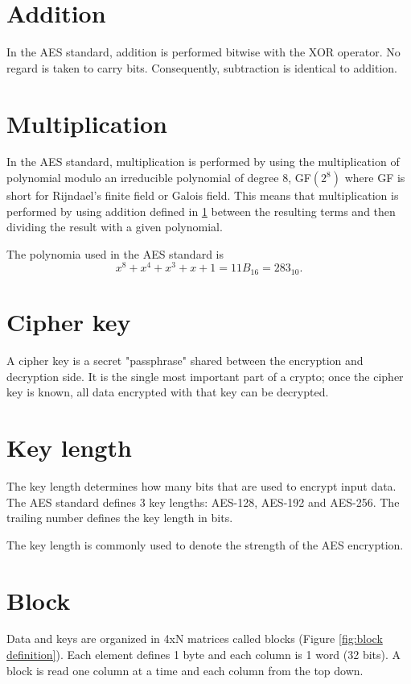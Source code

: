 \documentclass[report.tex]{subfiles}
\begin{document}
\section{Addition}\label{sec:addition}
In the AES standard, addition is performed bitwise with the XOR operator. No regard is taken to carry bits. Consequently, subtraction is identical to addition.

\section{Multiplication}\label{sec:multiplication}
In the AES standard, multiplication is performed by using the multiplication of polynomial modulo an irreducible polynomial of degree 8, GF$\left(2^{8}\right)$ where GF is short for Rijndael's finite field or Galois field.\cite{fips}\cite{galois} This means that multiplication is performed by using addition defined in \ref{sec:addition} between the resulting terms and then dividing the result with a given polynomial.

The polynomia used in the AES standard is
\begin{equation} \label{eq:multiplication polynomial}
	{x^{8} + x^{4} + x^{3} + x + 1} = 11B_{16} = 283_{10}.
\end{equation}


\section{Cipher key}
A cipher key is a secret "passphrase" shared between the encryption and decryption side. It is the single most important part of a crypto; once the cipher key is known, all data encrypted with that key can be decrypted.

\section{Key length} \label{sec:key length}
The key length determines how many bits that are used to encrypt input data. The AES standard defines 3 key lengths: AES-128, AES-192 and AES-256. The trailing number defines the key length in bits.

The key length is commonly used to denote the strength of the AES encryption.

\section{Block}
Data and keys are organized in 4xN matrices called blocks (Figure \ref{fig:block definition}). Each element defines 1 byte and each column is 1 word (32 bits). A block is read one column at a time and each column from the top down.
\end{document}
